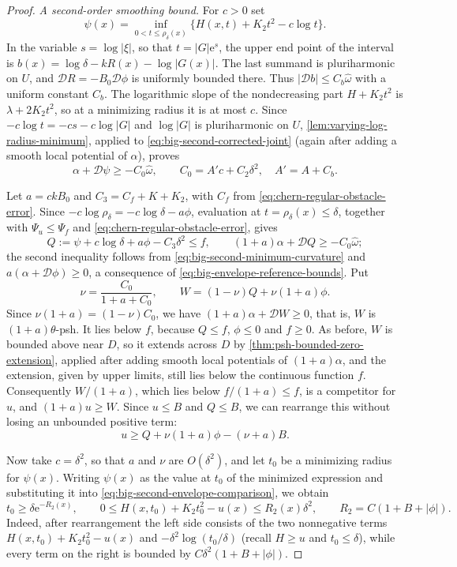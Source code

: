 \begin{proof}
\emph{A second-order smoothing bound.} For $c>0$ set
\[
 \psi(x)=\inf_{0<t\leq\rho_\delta(x)}
               \{H(x,t)+K_2t^2-c\log t\}.
\]
In the variable $s=\log|\xi|$, so that $t=|G|\mathrm e^s$, the upper end point of the interval is $b(x)=\log\delta-kR(x)-\log|G(x)|$. The last summand is pluriharmonic on $U$, and $\mathcal D R=-B_0\mathcal D\phi$ is uniformly bounded there. Thus $|\mathcal D b|\leq C_b\widehat\omega$ with a uniform constant $C_b$. The logarithmic slope of the nondecreasing part $H+K_2t^2$ is $\lambda+2K_2t^2$, so at a minimizing radius it is at most $c$. Since $-c\log t=-cs-c\log|G|$ and $\log|G|$ is pluriharmonic on $U$, \cref{lem:varying-log-radius-minimum}, applied to \eqref{eq:big-second-corrected-joint} (again after adding a smooth local potential of $\alpha$), proves
\begin{equation}\label{eq:big-second-minimum-curvature}
 \alpha+\mathcal D\psi\geq-C_0\widehat\omega,
 \qquad C_0=A'c+C_2\delta^2,\quad A'=A+C_b.
\end{equation}

Let $a=ckB_0$ and $C_3=C_f+K+K_2$, with $C_f$ from \eqref{eq:chern-regular-obstacle-error}. Since $-c\log\rho_\delta=-c\log\delta-a\phi$, evaluation at $t=\rho_\delta(x)\leq\delta$, together with $\Psi_u\leq\Psi_f$ and \eqref{eq:chern-regular-obstacle-error}, gives
\[
 Q:=\psi+c\log\delta+a\phi-C_3\delta^2\leq f,
 \qquad (1+a)\alpha+\mathcal DQ\geq-C_0\widehat\omega;
\]
the second inequality follows from \eqref{eq:big-second-minimum-curvature} and $a(\alpha+\mathcal D\phi)\geq0$, a consequence of \eqref{eq:big-envelope-reference-bounds}. Put
\[
 \nu=\frac{C_0}{1+a+C_0},\qquad
 W=(1-\nu)Q+\nu(1+a)\phi.
\]
Since $\nu(1+a)=(1-\nu)C_0$, we have $(1+a)\alpha+\mathcal DW\geq0$, that is, $W$ is $(1+a)\theta$-psh. It lies below $f$, because $Q\leq f$, $\phi\leq0$ and $f\geq0$. As before, $W$ is bounded above near $D$, so it extends across $D$ by \cref{thm:psh-bounded-zero-extension}, applied after adding smooth local potentials of $(1+a)\alpha$, and the extension, given by upper limits, still lies below the continuous function $f$. Consequently $W/(1+a)$, which lies below $f/(1+a)\leq f$, is a competitor for $u$, and $(1+a)u\geq W$. Since $u\leq B$ and $Q\leq B$, we can rearrange this without losing an unbounded positive term:
\begin{equation}\label{eq:big-second-envelope-comparison}
 u\geq Q+\nu(1+a)\phi-(\nu+a)B.
\end{equation}

Now take $c=\delta^2$, so that $a$ and $\nu$ are $O(\delta^2)$, and let $t_0$ be a minimizing radius for $\psi(x)$. Writing $\psi(x)$ as the value at $t_0$ of the minimized expression and substituting it into \eqref{eq:big-second-envelope-comparison}, we obtain
\begin{equation}\label{eq:big-second-radius-and-value}
 t_0\geq\delta\mathrm e^{-R_2(x)},\qquad
 0\leq H(x,t_0)+K_2t_0^2-u(x)\leq R_2(x)\delta^2,
 \qquad R_2=C(1+B+|\phi|).
\end{equation}
Indeed, after rearrangement the left side consists of the two nonnegative terms $H(x,t_0)+K_2t_0^2-u(x)$ and $-\delta^2\log(t_0/\delta)$ (recall $H\geq u$ and $t_0\leq\delta$), while every term on the right is bounded by $C\delta^2(1+B+|\phi|)$.


\end{proof}
